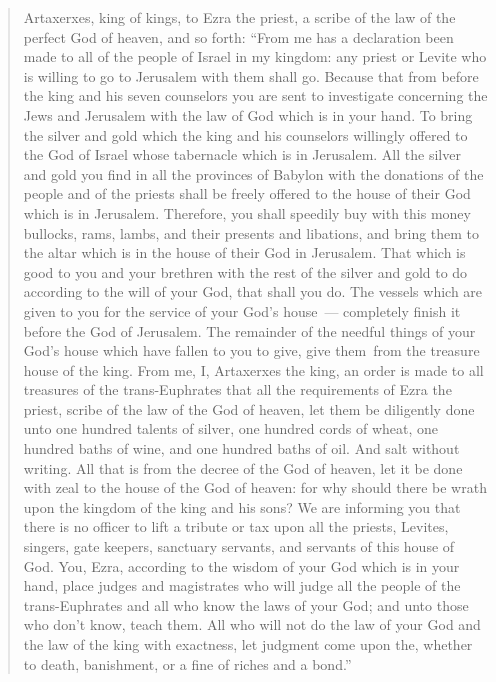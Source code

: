 \begin{quote}
    \begin{inparaenum}\setcounter{enumi}{11}
         Artaxerxes, king of kings, to Ezra the priest, a scribe of the law of the perfect God of heaven, and so forth:%
         ``From me has a declaration been made to all of the people of Israel in my kingdom: any priest or Levite who is willing to go to Jerusalem with them shall go.%
         Because that from before the king and his seven counselors you are sent to investigate concerning the Jews and Jerusalem with the law of God which is in your hand.%
         To bring the silver and gold which the king and his counselors willingly offered to the God of Israel whose tabernacle which is in Jerusalem.%
         All the silver and gold you find in all the provinces of Babylon with the donations of the people and of the priests shall be freely offered to the house of their God which is in Jerusalem.%
         Therefore, you shall speedily buy with this money bullocks, rams, lambs, and their presents and libations, and bring them to the altar which is in the house of their God in Jerusalem.%
         That which is good to you and your brethren with the rest of the silver and gold to do according to the will of your God, that shall you do.%
         The vessels which are given to you for the service of your God's house~--- completely finish it before the God of Jerusalem.%
         The remainder of the needful things of your God's house which have fallen to you to give, give them\understood\ from the treasure house of the king.%
         From me, I, Artaxerxes the king, an order is made to all treasures of the trans-Euphrates that all the requirements of Ezra the priest, scribe of the law of the God of heaven, let them be diligently done%
         unto one hundred talents of silver, one hundred cords of wheat, one hundred baths of wine, and one hundred baths of oil. And salt without writing.%
         All that is from the decree of the God of heaven, let it be done with zeal to the house of the God of heaven: for why should there be wrath upon the kingdom of the king and his sons?%
         We are informing you that there is no officer to lift a tribute or tax upon all the priests, Levites, singers, gate keepers, sanctuary servants, and servants of this house of God.%
         You, Ezra, according to the wisdom of your God which is in your hand, place judges and magistrates who will judge all the people of the trans-Euphrates and all who know the laws of your God; and unto those who don't know, teach them.%
         All who will not do the law of your God and the law of the king with exactness, let judgment come upon the, whether to death, banishment, or a fine of riches and a bond.''%
    \end{inparaenum}
\end{quote}
